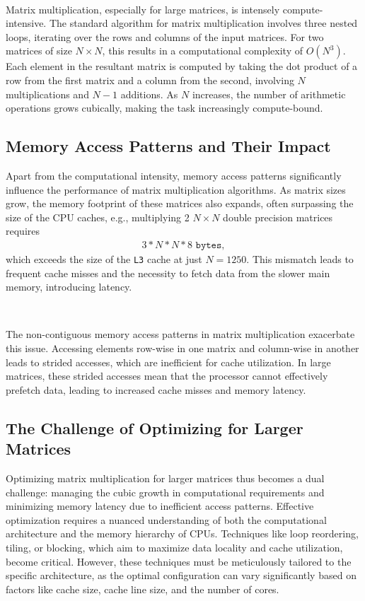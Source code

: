 \documentclass{article}
\begin{document}
\

\noindent Matrix multiplication, especially for large matrices, is intensely compute-intensive. 
The standard algorithm for matrix multiplication involves three nested loops, 
iterating over the rows and columns of the input matrices. 
For two matrices of size \( N \times N \), this results in a computational complexity of 
\( O(N^3) \). Each element in the resultant matrix is computed by taking the dot product of 
a row from the first matrix and a column from the second, involving \( N \) 
multiplications and \( N-1 \) additions. As \( N \) increases, the number of 
arithmetic operations grows cubically, making the task increasingly compute-bound.

\subsection{Memory Access Patterns and Their Impact}

Apart from the computational intensity, memory access patterns significantly 
influence the performance of matrix multiplication algorithms. As matrix sizes grow, 
the memory footprint of these matrices also expands, often surpassing the size of the CPU 
caches, e.g., multiplying 2 $N \times N$ double precision matrices requires
\begin{align*}
    3 * N * N * 8 \texttt{ bytes},
\end{align*}
which exceeds the size of the \texttt{L3} cache at just $N = 1250$.
This mismatch leads to frequent cache misses and the necessity to fetch 
data from the slower main memory, introducing latency.

\

\noindent The non-contiguous memory access patterns in matrix multiplication exacerbate this issue. 
Accessing elements row-wise in one matrix and column-wise in another leads to strided accesses, 
which are inefficient for cache utilization. In large matrices, these strided accesses mean that 
the processor cannot effectively prefetch data, leading to increased cache misses and memory 
latency.

\subsection{The Challenge of Optimizing for Larger Matrices}

Optimizing matrix multiplication for larger matrices thus becomes a dual challenge: managing the cubic growth in computational requirements and minimizing memory latency due to inefficient access patterns. Effective optimization requires a nuanced understanding of both the computational architecture and the memory hierarchy of CPUs. Techniques like loop reordering, tiling, or blocking, which aim to maximize data locality and cache utilization, become critical. However, these techniques must be meticulously tailored to the specific architecture, as the optimal configuration can vary significantly based on factors like cache size, cache line size, and the number of cores.
\end{document}
